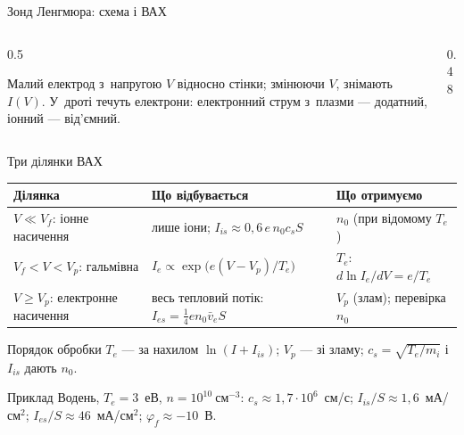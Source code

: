 \documentclass[]{beamer}
\newcommand{\fig}[2][\linewidth]{\resizebox{#1}{!}{}}
\newcommand{\figw}[1]{\resizebox{\linewidth}{!}{\begin{minipage}{11cm}\centering\end{minipage}}}
\newcommand{\cm}{\mathrm{см}}
\begin{document}
\begin{frame}{Зонд Ленгмюра: схема і ВАХ}
	\begin{columns}[T]
		\begin{column}{0.5\linewidth}
			\fig{probe-circuit.tikz}
			\begin{block}{}\justifying\scriptsize
				Малий електрод з~напругою $V$ відносно стінки; змінюючи $V$, знімають $I(V)$. У~дроті течуть електрони: електронний струм з~плазми
				--- додатний, іонний --- від'ємний.
			\end{block}
		\end{column}
		\begin{column}{0.48\linewidth}
			\figw{probe-iv.tikz}
		\end{column}
	\end{columns}
\end{frame}

\begin{frame}{Три ділянки ВАХ}
	\begin{table}\centering\scriptsize
		\setlength{\tabcolsep}{3pt}
		\renewcommand{\arraystretch}{1.5}
		\begin{tabular}{p{2.3cm}p{4.2cm}p{2.6cm}}
			\hline
			Ділянка & Що відбувається & Що отримуємо \\
			\hline
			$V\ll V_f$: іонне насичення & лише іони; $I_{is}\approx0{,}6\,e\,n_0c_sS$ & $n_0$ (при відомому $T_e$) \\
			$V_f<V<V_p$: гальмівна & $I_e\propto\exp\bigl(e(V-V_p)/T_e\bigr)$ & $T_e$: $d\ln I_e/dV=e/T_e$ \\
			$V\ge V_p$: електронне насичення & весь тепловий потік: $I_{es}=\tfrac14en_0\bar v_eS$ & $V_p$ (злам); перевірка $n_0$ \\
			\hline
		\end{tabular}
	\end{table}
	\begin{block}{Порядок обробки}\justifying\small
		$T_e$ --- за нахилом $\ln(I+I_{is})$; $V_p$ --- зі зламу; $c_s=\sqrt{T_e/m_i}$ і~$I_{is}$ дають $n_0$.
	\end{block}
	\begin{exampleblock}{Приклад}\small
		Водень, $T_e=3$~еВ, $n=10^{10}~\cm^{-3}$: $c_s\approx1{,}7\cdot10^6$~см/с; $I_{is}/S\approx1{,}6$~мА/см$^2$; $I_{es}/S\approx46$~мА/см$^2$; $\varphi_f\approx-10$~В.
	\end{exampleblock}
\end{frame}
\end{document}
